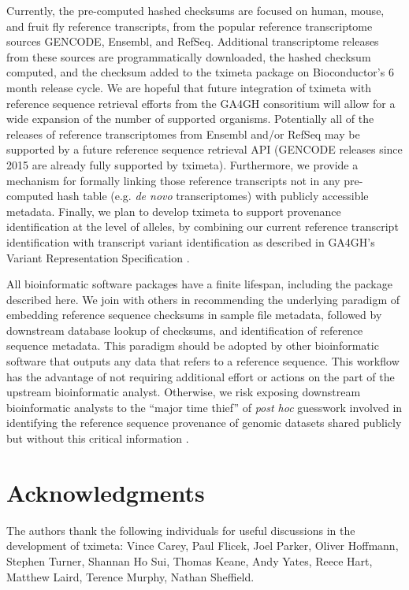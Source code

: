 \documentclass[12pt]{article} \usepackage[utf8]{inputenc}
\begin{document}
Currently, the pre-computed hashed checksums are focused on human,
mouse, and fruit fly reference transcripts, from the popular reference
transcriptome sources GENCODE, Ensembl, and RefSeq. Additional
transcriptome releases from these sources are programmatically
downloaded, the hashed checksum computed, and the checksum added to
the tximeta package on Bioconductor's 6 month release cycle. We are
hopeful that future integration of tximeta with reference sequence
retrieval efforts from the GA4GH consoritium will allow for a wide
expansion of the number of supported organisms. Potentially all of the
releases of reference transcriptomes from Ensembl and/or RefSeq may be
supported by a future reference sequence retrieval API (GENCODE
releases since 2015 are already fully supported by
tximeta). Furthermore, we provide a mechanism for formally linking
those reference transcripts not in any pre-computed hash table
(e.g. \textit{de novo} transcriptomes) with publicly accessible
metadata. Finally, we plan to develop tximeta to support provenance
identification at the level of alleles, by combining our current
reference transcript identification with transcript variant
identification as described in GA4GH's Variant Representation
Specification \citep{vr}.

All bioinformatic software packages have a finite lifespan, including
the package described here. We join with others in
recommending the underlying paradigm of embedding reference sequence
checksums in sample file metadata, followed by downstream database
lookup of checksums, and identification of reference sequence
metadata. This paradigm should be adopted by other bioinformatic
software that outputs any data that refers to a reference
sequence. This workflow has the advantage of not requiring additional
effort or actions on the part of the upstream bioinformatic
analyst. Otherwise, we risk exposing downstream bioinformatic analysts
to the ``major time thief'' of \textit{post hoc} guesswork involved in
identifying the reference sequence provenance of genomic datasets
shared publicly but without this critical information
\citep{Kanduri2017}.

\section*{Acknowledgments}

The authors thank the following individuals for useful discussions 
in the development of tximeta: Vince Carey, Paul Flicek, Joel Parker,
Oliver Hoffmann, Stephen Turner, Shannan Ho Sui, Thomas Keane, Andy
Yates, Reece Hart, Matthew Laird, Terence Murphy, Nathan Sheffield.

\nocite{*}


\end{document}
